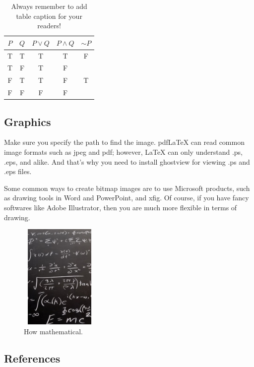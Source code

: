 \documentclass[11pt]{amsart}
\theoremstyle{plain}%
\theoremstyle{definition}
\theoremstyle{remark}
\numberwithin{equation}{section}
\begin{document}
\begin{table}[ht]
\begin{center}
\begin{tabular}{cc|c|c|c} \hline
$P$ & $Q$ & $P\vee Q$ & $P\wedge Q$& $\sim P$  \\ \hline
T & T & T & T & F \\
T & F & T & F & \\
F & T & T & F & T  \\
F & F & F & F  & \\ \hline
\end{tabular}
\caption{Always remember to add table caption for your readers!}
\end{center}
\end{table}

\subsection{Graphics}

Make sure you specify the path to find the image. pdfLaTeX can read common image formats such as jpeg and pdf; however, LaTeX can only understand .ps, .eps, and alike. And that's why you need to install ghostview for viewing .ps and .eps files.

Some common ways to create bitmap images are to use Microsoft products, such as drawing tools in Word and PowerPoint, and xfig. Of course, if you have fancy softwares like Adobe Illustrator, then you are much more flexible in terms of drawing.

\begin{figure}[ht]
\begin{center}
\includegraphics[width=1.5in,height=2in]{./sample_img.jpg}
\caption{How mathematical.}\label{fig:mathImg}
\end{center}
\end{figure}

\subsection{References}
\end{document}
